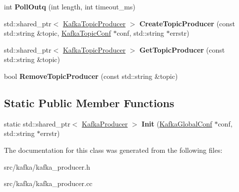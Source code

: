 \begin{DoxyCompactItemize}
\item 
int {\bfseries Poll\+Outq} (int length, int timeout\+\_\+ms)\hypertarget{classlog2hdfs_1_1KafkaProducer_a47b7fd4233de4d031a5ced43ea5f3143}{}\label{classlog2hdfs_1_1KafkaProducer_a47b7fd4233de4d031a5ced43ea5f3143}

\item 
std\+::shared\+\_\+ptr$<$ \hyperlink{classlog2hdfs_1_1KafkaTopicProducer}{Kafka\+Topic\+Producer} $>$ {\bfseries Create\+Topic\+Producer} (const std\+::string \&topic, \hyperlink{classlog2hdfs_1_1KafkaTopicConf}{Kafka\+Topic\+Conf} $\ast$conf, std\+::string $\ast$errstr)\hypertarget{classlog2hdfs_1_1KafkaProducer_a6a575d829809d57079cb1b7dfaa1a0da}{}\label{classlog2hdfs_1_1KafkaProducer_a6a575d829809d57079cb1b7dfaa1a0da}

\item 
std\+::shared\+\_\+ptr$<$ \hyperlink{classlog2hdfs_1_1KafkaTopicProducer}{Kafka\+Topic\+Producer} $>$ {\bfseries Get\+Topic\+Producer} (const std\+::string \&topic)\hypertarget{classlog2hdfs_1_1KafkaProducer_a381bbd9402c540a5fb5d1db4704ab2b6}{}\label{classlog2hdfs_1_1KafkaProducer_a381bbd9402c540a5fb5d1db4704ab2b6}

\item 
bool {\bfseries Remove\+Topic\+Producer} (const std\+::string \&topic)\hypertarget{classlog2hdfs_1_1KafkaProducer_aa9e087dc8eb96bcf36865885843d4919}{}\label{classlog2hdfs_1_1KafkaProducer_aa9e087dc8eb96bcf36865885843d4919}

\end{DoxyCompactItemize}
\subsection*{Static Public Member Functions}
\begin{DoxyCompactItemize}
\item 
static std\+::shared\+\_\+ptr$<$ \hyperlink{classlog2hdfs_1_1KafkaProducer}{Kafka\+Producer} $>$ {\bfseries Init} (\hyperlink{classlog2hdfs_1_1KafkaGlobalConf}{Kafka\+Global\+Conf} $\ast$conf, std\+::string $\ast$errstr)\hypertarget{classlog2hdfs_1_1KafkaProducer_a3173956fc8555ceff400153364f5296b}{}\label{classlog2hdfs_1_1KafkaProducer_a3173956fc8555ceff400153364f5296b}

\end{DoxyCompactItemize}


The documentation for this class was generated from the following files\+:\begin{DoxyCompactItemize}
\item 
src/kafka/kafka\+\_\+producer.\+h\item 
src/kafka/kafka\+\_\+producer.\+cc\end{DoxyCompactItemize}
